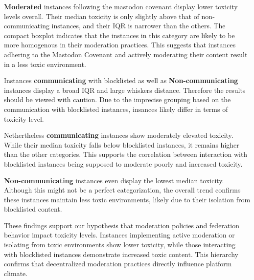 \textbf{Moderated} instances following the mastodon covenant display lower toxicity levels overall. Their median toxicity is only slightly above that of non-communicating instances, and their IQR is narrower than the others. The compact boxplot indicates that the instances in this category are likely to be more homogenous in their moderation practices. This suggests that instances adhering to the Mastodon Covenant and actively moderating their content result in a less toxic environment.

Instances \textbf{communicating} with blocklisted as well as \textbf{Non-communicating} instances display a broad IQR and large whiskers distance. Therefore the results should be viewed with caution. Due to the imprecise grouping based on the communication with blocklisted instances, insances likely differ in terms of toxicity level. 

Nethertheless \textbf{communicating} instances show moderately elevated toxicity. While their median toxicity falls below blocklisted instances, it remains higher than the other categories. This supports the correlation between interaction with blocklisted instances being supposed to moderate poorly and increased toxicity. 

\textbf{Non-communicating} instances even display the lowest median toxicity. Although this might not be a perfect categorization, the overall trend confirms these instances maintain less toxic environments, likely due to their isolation from blocklisted content.

These findings support our hypothesis that moderation policies and federation behavior impact toxicity levels. Instances implementing active moderation or isolating from toxic environments show lower toxicity, while those interacting with blocklisted instances demonstrate increased toxic content. This hierarchy confirms that decentralized moderation practices directly influence platform climate.
